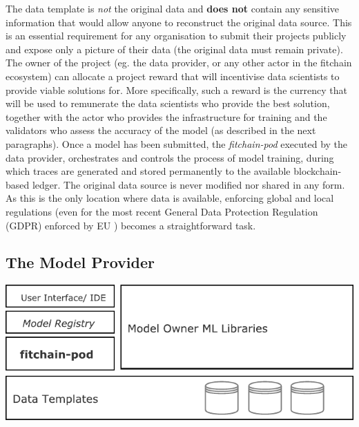 \documentclass[12pt, a4paper,titlepage]{extreport}
\begin{document}
The data template is \textit{not} the original data and \textbf{does not} contain any sensitive information that would allow anyone to reconstruct the original data source. This is an essential requirement for any organisation to submit their projects publicly and expose only a picture of their data (the original data must remain private).
The owner of the project (eg. the data provider, or any other actor in the fitchain ecosystem) can allocate a project reward that will incentivise data scientists to provide viable solutions for. More specifically, such a reward is the currency that will be used to remunerate the data scientists who provide the best solution, together with the actor who provides the infrastructure for training and the validators who assess the accuracy of the model (as described in the next paragraphs).
Once a model has been submitted, the \textit{fitchain-pod} executed by the data provider, orchestrates and controls the process of model training, during which traces are generated and stored permanently to the available blockchain-based ledger.
The original data source is never modified nor shared in any form. As this is the only location where data is available, enforcing global and local regulations (even for the most recent General Data Protection Regulation (GDPR) enforced by EU \cite{GDPR}) becomes a straightforward task.

\subsection{The Model Provider}

\begin{center}
\includegraphics[scale=1]{pod_modelowner.pdf} 
\end{center}
\end{document}
